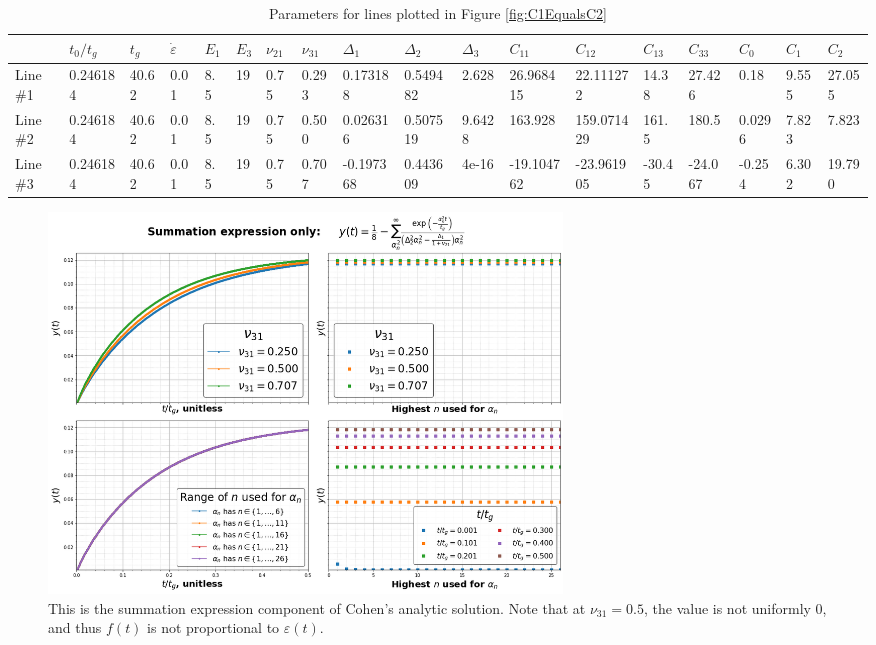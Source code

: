 \documentclass{article}
\begin{document}
\begin{table}[!ht]
    \centering
    \caption{\label{tab:C1EqualsC2} Parameters for lines plotted in {Figure \ref{fig:C1EqualsC2}}}
    \tiny
    \begin{tabular}{|l|l|l|l|l|l|l|l|l|l|l|l|l|l|l|l|l|l|}
    \hline
    \rowcolor[HTML]{C0C0C0} 
        ~                        & $t_0/t_g$ & $t_g$ & $\dot{\varepsilon{}}$ & $E_1$ & $E_3$ & $\nu_{21}$ & $\nu_{31}$ & $\Delta_1$ & $\Delta_2$ & $\Delta_3$ & $C_{11}$   & $C_{12}$   & $C_{13}$ & $C_{33}$ & $C_0$  & $C_1$ & $C_2$  \\ \hline
\cellcolor[HTML]{EFEFEF}Line \#1 & 0.246184  & 40.62 & 0.01                  & 8.5   & 19    & 0.75       & 0.293      & 0.173188   & 0.549482   & 2.628      & 26.968415  & 22.111272  & 14.38    & 27.426   & 0.18   & 9.555 & 27.055 \\ \hline
\cellcolor[HTML]{EFEFEF}Line \#2 & 0.246184  & 40.62 & 0.01                  & 8.5   & 19    & 0.75       & 0.500        & 0.026316   & 0.507519   & 9.6428     & 163.928    & 159.071429 & 161.5    & 180.5    & 0.0296 & 7.823 & 7.823  \\ \hline
\cellcolor[HTML]{EFEFEF}Line \#3 & 0.246184  & 40.62 & 0.01                  & 8.5   & 19    & 0.75       & 0.707      & -0.197368  & 0.443609   & 4e-16      & -19.104762 & -23.961905 & -30.45   & -24.067  & -0.254 & 6.302 & 19.790 \\ \hline
    \end{tabular}
\end{table}

\begin{figure}  %
\centering
\caption{\label{fig:Summation_expression_only} This is the summation expression component of Cohen's analytic solution. Note that at $\nu_{31}=0.5$, the value is not uniformly $0$, and thus $f(t)$ is not proportional to $\varepsilon(t)$.}
\includegraphics[width=0.66\textwidth]{Summation_expression_only.png}
\end{figure}
\end{document}
